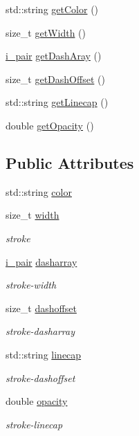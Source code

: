 \begin{DoxyCompactItemize}
\item 
std\+::string \mbox{\hyperlink{structvegra_1_1Stroke_a6fa9107861ae4898e29baac94866f229}{get\+Color}} ()
\item 
size\+\_\+t \mbox{\hyperlink{structvegra_1_1Stroke_a695152e114e79817e53bb3d67e137228}{get\+Width}} ()
\item 
\mbox{\hyperlink{structvegra_1_1Stroke_af5a2b4ee71962d044ebb7a309b22bb8a}{i\+\_\+pair}} \mbox{\hyperlink{structvegra_1_1Stroke_ae396487e8776add16ddd78cdd436034f}{get\+Dash\+Aray}} ()
\item 
size\+\_\+t \mbox{\hyperlink{structvegra_1_1Stroke_aae4b7e22569da832b7279dd1e98c6dea}{get\+Dash\+Offset}} ()
\item 
std\+::string \mbox{\hyperlink{structvegra_1_1Stroke_a5a9f290ed03bc2dbcd120ffc7d0bd52d}{get\+Linecap}} ()
\item 
double \mbox{\hyperlink{structvegra_1_1Stroke_ab472a9732c83c1e4547d32ccf4b91877}{get\+Opacity}} ()
\end{DoxyCompactItemize}
\subsection*{Public Attributes}
\begin{DoxyCompactItemize}
\item 
std\+::string \mbox{\hyperlink{structvegra_1_1Stroke_a407c59871f2ade9be29d2c5dfe28d21d}{color}}
\item 
size\+\_\+t \mbox{\hyperlink{structvegra_1_1Stroke_a95579e85bd704a94840674bbdee34304}{width}}
\begin{DoxyCompactList}\small\item\em stroke \end{DoxyCompactList}\item 
\mbox{\hyperlink{structvegra_1_1Stroke_af5a2b4ee71962d044ebb7a309b22bb8a}{i\+\_\+pair}} \mbox{\hyperlink{structvegra_1_1Stroke_a649828302bf54741b69ffeca87cbabbf}{dasharray}}
\begin{DoxyCompactList}\small\item\em stroke-\/width \end{DoxyCompactList}\item 
size\+\_\+t \mbox{\hyperlink{structvegra_1_1Stroke_aac202e47f5066fcd16cd4e1b1296214d}{dashoffset}}
\begin{DoxyCompactList}\small\item\em stroke-\/dasharray \end{DoxyCompactList}\item 
std\+::string \mbox{\hyperlink{structvegra_1_1Stroke_a67a29aa2a553bf490f8556dd526fcfcf}{linecap}}
\begin{DoxyCompactList}\small\item\em stroke-\/dashoffset \end{DoxyCompactList}\item 
double \mbox{\hyperlink{structvegra_1_1Stroke_a1549534821eb8e96632f405af3c59d26}{opacity}}
\begin{DoxyCompactList}\small\item\em stroke-\/linecap \end{DoxyCompactList}\end{DoxyCompactItemize}


